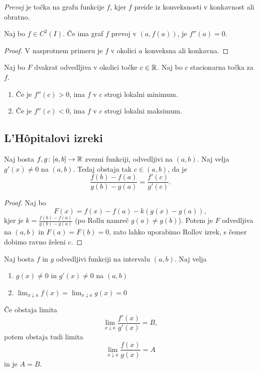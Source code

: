 \documentclass[12pt, a4paper]{article}
\begin{document}
\begin{definicija}
\emph{Prevoj} je točka na grafu funkcije $f$, kjer $f$ preide iz konveksnosti v konkavnost ali obratno.
\end{definicija}

\begin{posledica}
Naj bo $f\in C^2(I)$. Če ima graf $f$ prevoj v $(a,f(a))$, je $f''(a)=0$.
\end{posledica}

\begin{proof}
V nasprotnem primeru je $f$ v okolici $a$ konveksna ali konkavna.
\end{proof}

\begin{posledica}
Naj bo $F$ dvakrat odvedljiva v okolici točke $c\in\mathbb{R}$. Naj bo $c$ stacionarna točka za $f$.

\begin{enumerate}[label=\roman*)]
\item Če je $f''(c)>0$, ima $f$ v $c$ strogi lokalni minimum.
\item Če je $f''(c)<0$, ima $f$ v $c$ strogi lokalni maksimum.
\end{enumerate}
\end{posledica}

\obvs

\newpage

\subsection{L'Hôpitalovi izreki}

\begin{izrek}
Naj bosta $f,g\colon[a,b]\to\mathbb{R}$ zvezni funkciji, odvedljivi na $(a,b)$. Naj velja $g'(x)\ne 0$ na $(a,b)$. Tedaj obstaja tak $c\in(a,b)$, da je
\[
\frac{f(b)-f(a)}{g(b)-g(a)}=\frac{f'(c)}{g'(c)}.
\]
\end{izrek}

\begin{proof}
Naj bo
\[
F(x)=f(x)-f(a)-k(g(x)-g(a)),
\]
kjer je $k=\frac{f(b)-f(a)}{g(b)-g(a)}$ (po Rollu namreč $g(a)\ne g(b)$). Potem je $F$ odvedljiva na $(a,b)$ in $F(a)=F(b)=0$, zato lahko uporabimo Rollov izrek, s čemer dobimo ravno želeni $c$.
\end{proof}

\begin{izrek}[L'Hôpital]
Naj bosta $f$ in $g$ odvedljivi funkciji na intervalu $(a,b)$. Naj velja

\begin{enumerate}[label=\roman*)]
\item $g(x)\ne 0$ in $g'(x)\ne 0$ na $(a,b)$
\item $\displaystyle\lim_{x\downarrow a}f(x)=\lim_{x\downarrow a}g(x)=0$
\end{enumerate}
Če obstaja limita
\[
\lim_{x\downarrow a}\frac{f'(x)}{g'(x)}=B,
\]
potem obstaja tudi limita
\[
\lim_{x\downarrow a}\frac{f(x)}{g(x)}=A
\]
in je $A=B$.
\end{izrek}
\end{document}
